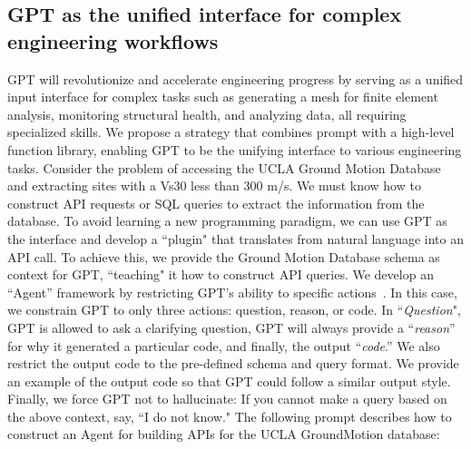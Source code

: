 \documentclass{article}
\begin{document}
\subsection{GPT as the unified interface for complex engineering workflows}

GPT will revolutionize and accelerate engineering progress by serving as a unified input interface for complex tasks such as generating a mesh for finite element analysis, monitoring structural health, and analyzing data, all requiring specialized skills. We propose a strategy that combines prompt with a high-level function library, enabling GPT to be the unifying interface to various engineering tasks. Consider the problem of accessing the UCLA Ground Motion Database \parencite{brandenburg2022} and extracting sites with a Vs30 less than 300 m/s. We must know how to construct API requests or SQL queries to extract the information from the database. To avoid learning a new programming paradigm, we can use GPT as the interface and develop a ``plugin" that translates from natural language into an API call. To achieve this, we provide the Ground Motion Database schema as context for GPT, ``teaching" it how to construct API queries. We develop an ``Agent” framework by restricting GPT’s ability to specific actions~\parencite{yao2022react}. In this case, we constrain GPT to only three actions: question, reason, or code. In ``\textit{Question}", GPT is allowed to ask a clarifying question, GPT will always provide a ``\textit{reason}” for why it generated a particular code, and finally, the output ``\textit{code}.” We also restrict the output code to the pre-defined schema and query format. We provide an example of the output code so that GPT could follow a similar output style. Finally, we force GPT not to hallucinate: \textcolor{RedOrange}{If you cannot make a query based on the above context, say, ``I do not know." }The following prompt describes how to construct an Agent for building APIs for the UCLA GroundMotion database:\\\\
\end{document}
